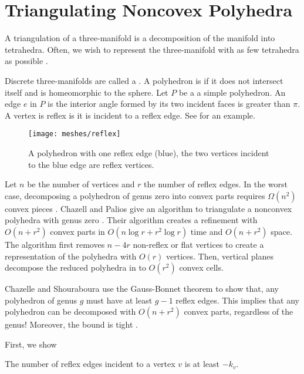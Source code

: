\section{Triangulating Noncovex Polyhedra}
\label{sec:triangulating}

A triangulation of a three-manifold is a decomposition
of the manifold into tetrahedra.
Often, we wish to represent the three-manifold
with as few tetrahedra as possible \cite{simplify-mesh-1999}.

Discrete three-manifolds are called a . 
A polyhedron is  if it does not intersect itself and is homeomorphic to the sphere.
Let $P$ be a a simple polyhedron. An edge $e$ in $P$ is
 the interior angle formed by its two incident faces
is greater than $\pi$.
A vertex is reflex is it is incident to a reflex edge.
See  for an example.

\begin{figure}[htb]
\centering
\texttt{[image: meshes/reflex]}
\caption{A polyhedron with one reflex edge (blue), the two vertices incident to the blue
edge are reflex vertices.}
\label{fig:reflex}
\end{figure}

Let $n$ be the number of vertices and $r$ the number of reflex edges.
In the worst case, decomposing a polyhedron of genus
zero into convex parts requires $\Omega(n^2)$ convex pieces
\cite{chazelle-lower-1984}.
Chazell and Palios give an
algorithm to triangulate a nonconvex polyhedra with genus
zero \cite{triangulating-polytope-1990}.
 Their algorithm creates a refinement with $O(n+r^2)$ convex parts
in $O(n\log r +r^2\log r)$ time and $O(n+r^2)$ space.
The algorithm first removes $n-4r$ non-reflex or flat vertices
to create a representation of the polyhedra with $O(r)$ vertices.
Then, vertical planes decompose the reduced polyhedra in to
$O(r^2)$ convex cells.

Chazelle and Shouraboura use the 
 Gauss-Bonnet theorem to show that, any polyhedron
 of genus $g$ must have at least $g-1$ reflex edges.
 This implies that any polyhedron
can be decomposed with $O(n+r^2)$ convex parts, regardless  of 
the genus! Moreover, the bound is tight \cite{tetra-bounds-c-s-1994}.


First, we show 

\begin{lemma}\label{lem:reflex-edge}
The number of reflex edges  incident to a vertex $v$  is at least $-k_v.$
\end{lemma}

